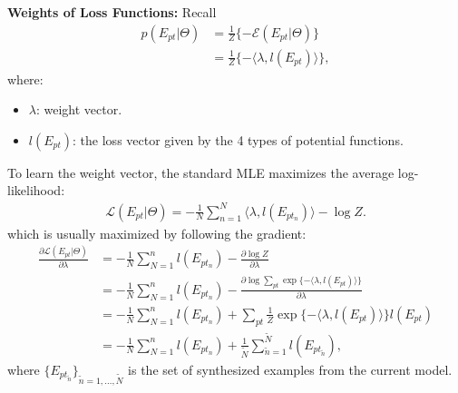\documentclass[10pt]{article}
\begin{document}
\textbf{Weights of Loss Functions:} Recall
%
\begin{align}
  p(E_{pt} \vert \Theta) &= \frac{1}{Z} \{-\mathcal{E}(E_{pt} \vert \Theta)\} \label{eq:11} \\
                         &= \frac{1}{Z} \{-\langle \lambda, l(E_{pt}) \rangle\}, \label{eq:12}
\end{align}
%
where:
%
\begin{itemize}
  \item $\lambda$: weight vector.
  \item $l(E_{pt})$: the loss vector given by the 4 types of potential functions.
\end{itemize}

To learn the weight vector, the standard MLE maximizes the average
log-likelihood:
%
\begin{align}
  \label{eq:13}
  \mathcal{L}(E_{pt} \vert \Theta) = -\frac{1}{N} \sum^N_{n=1} \langle \lambda, l(E_{pt_n}) \rangle - \log Z.
\end{align}
%
which is usually maximized by following the gradient:
%
\begin{align}
  \frac{\partial \mathcal{L}(E_{pt} \vert \Theta)}{\partial \lambda} &= -\frac{1}{N} \sum^n_{N=1} l(E_{pt_n}) - \frac{\partial \log Z}{\partial \lambda} \label{eq:14} \\
                                                                     &= -\frac{1}{N} \sum^n_{N=1} l(E_{pt_n}) - \frac{\partial \log \sum_{pt} \exp \{-\langle \lambda, l(E_{pt}) \rangle\}}{\partial \lambda} \label{eq:15} \\
                                                                     &= -\frac{1}{N} \sum^n_{N=1} l(E_{pt_n}) + \sum_{pt} \frac{1}{Z} \exp \{-\langle \lambda, l(E_{pt}) \rangle\} l(E_{pt}) \label{eq:16} \\
                                                                     &= -\frac{1}{N} \sum^n_{N=1} l(E_{pt_n}) + \frac{1}{\widetilde{N}} \sum^{\widetilde{N}}_{\widetilde{n}=1} l(E_{pt_{\widetilde{n}}}), \label{eq:17}
\end{align}
%
where ${\{E_{pt_{\widetilde{n}}}\}}_{\widetilde{n}=1, \ldots, \widetilde{N}}$
is the set of synthesized examples from the current model.
\end{document}
